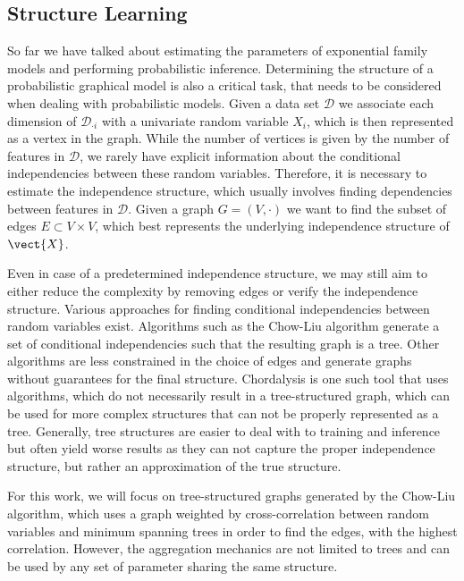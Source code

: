 \subsection{Structure Learning}

So far we have talked about estimating the parameters of exponential family models and performing probabilistic inference.
Determining the structure of a probabilistic graphical model is also a critical task, that needs to be considered when dealing with probabilistic models.
Given a data set $\mathcal{D}$ we associate each dimension of $\mathcal{D}_{\cdot i}$ with a univariate random variable $X_i$, which is then represented as a vertex in the graph.
While the number of vertices is given by the number of features in $\mathcal{D}$, we rarely have explicit information about the conditional independencies between these random variables. 
Therefore, it is necessary to estimate the independence structure, which usually involves finding dependencies between features in $\mathcal{D}$. 
Given a graph $G=(V, \cdot)$ we want to find the subset of edges $E \subset V \times V$, which best represents the underlying independence structure of $\vect{X}$.

Even in case of a predetermined independence structure, we may still aim to either reduce the complexity by removing edges or verify the independence structure.
Various approaches for finding conditional independencies between random variables exist.
Algorithms such as the Chow-Liu algorithm generate a set of conditional independencies such that the resulting graph is a tree.
Other algorithms are less constrained in the choice of edges and generate graphs without guarantees for the final structure.
Chordalysis is one such tool that uses algorithms, which do not necessarily result in a tree-structured graph, which can be used for more complex structures that can not be properly represented as a tree. 
Generally, tree structures are easier to deal with \wrt to training and inference but often yield worse results as they can not capture the proper independence structure, but rather an approximation of the true structure.

For this work, we will focus on tree-structured graphs generated by the Chow-Liu algorithm, which uses a graph weighted by cross-correlation between random variables and minimum spanning trees in order to find the edges, with the highest correlation.
However, the aggregation mechanics are not limited to trees and can be used by any set of parameter sharing the same structure.

